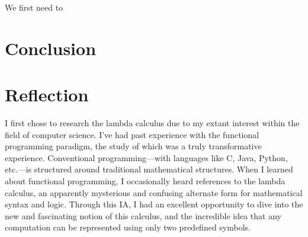 \documentclass[twocolumn,titlepage,12pt]{article}
\begin{document}
We first need to

\section{Conclusion}


\section{Reflection}
I first chose to research the lambda calculus due to my extant interest within the field of computer science. I've had past experience with the functional programming paradigm, the study of which was a truly transformative experience. Conventional programming---with languages like C, Java, Python, etc.---is structured around traditional mathematical structures. When I learned about functional programming, I occasionally heard references to the lambda calculus, an apparently mysterious and confusing alternate form for mathematical syntax and logic.
Through this IA, I had an excellent opportunity to dive into the new and fascinating notion of this calculus, and the incredible idea that any computation can be represented using only two predefined symbols.


\end{document}
